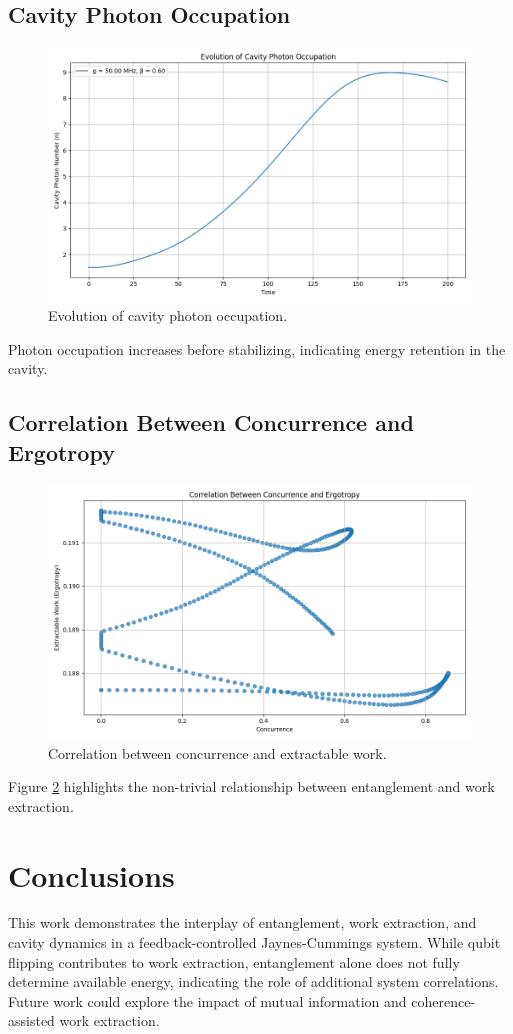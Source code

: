 \documentclass[a4paper,12pt]{article}
\begin{document}
\subsection{Cavity Photon Occupation}
\begin{figure}[h]
\centering
\includegraphics[width=0.7\linewidth]{Figure3.png}
\caption{Evolution of cavity photon occupation.}
\label{fig:photons}
\end{figure}

Photon occupation increases before stabilizing, indicating energy retention in the cavity.

\subsection{Correlation Between Concurrence and Ergotropy}
\begin{figure}[h]
\centering
\includegraphics[width=0.7\linewidth]{Figure4.png}
\caption{Correlation between concurrence and extractable work.}
\label{fig:correlation}
\end{figure}

Figure \ref{fig:correlation} highlights the non-trivial relationship between entanglement and work extraction.

\section{Conclusions}
This work demonstrates the interplay of entanglement, work extraction, and cavity dynamics in a feedback-controlled 
Jaynes-Cummings system. While qubit flipping contributes to work extraction, entanglement alone does not fully determine 
available energy, indicating the role of additional system correlations. Future work could explore the impact of mutual 
information and coherence-assisted work extraction.
\end{document}
